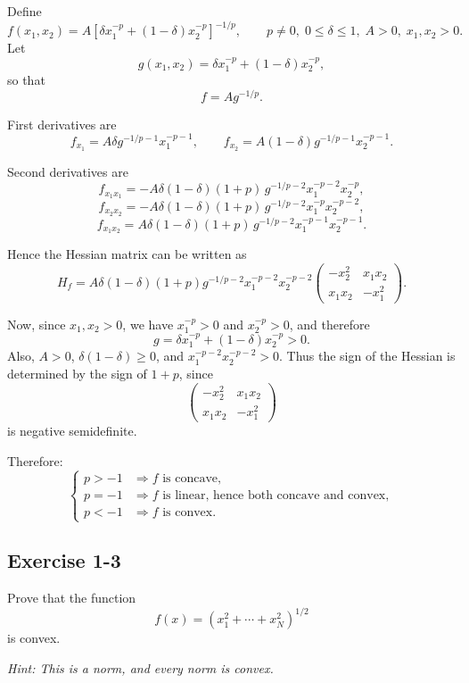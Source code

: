 Define
\[
f(x_1,x_2)=A\left[\delta x_1^{-p}+(1-\delta)x_2^{-p}\right]^{-1/p},
\qquad p\neq 0,\; 0\le \delta \le 1,\; A>0,\; x_1,x_2>0.
\]
Let
\[
g(x_1,x_2)=\delta x_1^{-p}+(1-\delta)x_2^{-p},
\]
so that
\[
f=A g^{-1/p}.
\]

First derivatives are
\[
f_{x_1}=A\delta g^{-1/p-1}x_1^{-p-1},
\qquad
f_{x_2}=A(1-\delta)g^{-1/p-1}x_2^{-p-1}.
\]

Second derivatives are
\[
f_{x_1x_1}
=
-A\delta(1-\delta)(1+p)\,
g^{-1/p-2}x_1^{-p-2}x_2^{-p},
\]
\[
f_{x_2x_2}
=
-A\delta(1-\delta)(1+p)\,
g^{-1/p-2}x_1^{-p}x_2^{-p-2},
\]
\[
f_{x_1x_2}
=
A\delta(1-\delta)(1+p)\,
g^{-1/p-2}x_1^{-p-1}x_2^{-p-1}.
\]

Hence the Hessian matrix can be written as
\[
H_f
=
A\delta(1-\delta)(1+p)g^{-1/p-2}x_1^{-p-2}x_2^{-p-2}
\begin{pmatrix}
-x_2^2 & x_1x_2\\
x_1x_2 & -x_1^2
\end{pmatrix}.
\]

Now, since \(x_1,x_2>0\), we have \(x_1^{-p}>0\) and \(x_2^{-p}>0\), and therefore
\[
g=\delta x_1^{-p}+(1-\delta)x_2^{-p}>0.
\]
Also, \(A>0\), \(\delta(1-\delta)\ge 0\), and \(x_1^{-p-2}x_2^{-p-2}>0\). Thus the sign of the Hessian is determined by the sign of \(1+p\), since
\[
\begin{pmatrix}
-x_2^2 & x_1x_2\\
x_1x_2 & -x_1^2
\end{pmatrix}
\]
is negative semidefinite.

Therefore:
\[
\boxed{
\begin{cases}
p>-1 &\Rightarrow f \text{ is concave},\\[1mm]
p=-1 &\Rightarrow f \text{ is linear, hence both concave and convex},\\[1mm]
p<-1 &\Rightarrow f \text{ is convex}.
\end{cases}}
\]




\vspace{30pt}
\begin{tcolorbox}[breakable]

\subsection*{Exercise 1-3}

Prove that the function
\[
f(x) = \left(x_1^2 + \cdots + x_N^2\right)^{1/2}
\]
is convex.

\textit{Hint: This is a norm, and every norm is convex.}

\end{tcolorbox}



